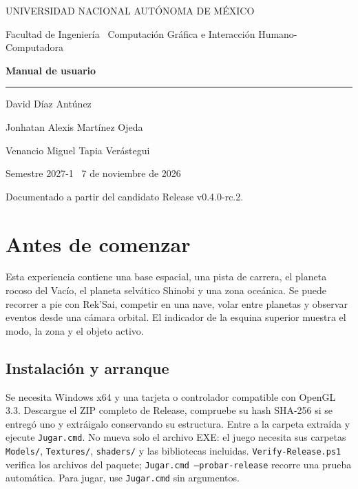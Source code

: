 \documentclass[11pt,letterpaper]{article}
\begin{document}
\begin{titlepage}
\color{azul}\sffamily
\vspace*{2.8cm}
{\Large UNIVERSIDAD NACIONAL AUTÓNOMA DE MÉXICO\par}
{\large Facultad de Ingeniería \textbar\ Computación Gráfica e Interacción Humano-Computadora\par}
\vspace{2cm}
{\Huge\bfseries Manual de usuario\par}
\vspace{0.5cm}{\Large Viajes espaciales y evolución de especies intergalácticas\par}
\vspace{1.5cm}\rule{\linewidth}{2pt}\vspace{0.5cm}
{\large David Díaz Antúnez\par Jonhatan Alexis Martínez Ojeda\par Venancio Miguel Tapia Verástegui\par}
\vfill{\large Semestre 2027-1 \textbar\ 7 de noviembre de 2026\par}
{\small Documentado a partir del candidato Release v0.4.0-rc.2.\par}
\end{titlepage}
\tableofcontents\newpage

\section{Antes de comenzar}
Esta experiencia contiene una base espacial, una pista de carrera, el planeta rocoso del Vacío, el planeta selvático Shinobi y una zona oceánica. Se puede recorrer a pie con Rek'Sai, competir en una nave, volar entre planetas y observar eventos desde una cámara orbital. El indicador de la esquina superior muestra el modo, la zona y el objeto activo.

\subsection{Instalación y arranque}
Se necesita Windows x64 y una tarjeta o controlador compatible con OpenGL 3.3. Descargue el ZIP completo de Release, compruebe su hash SHA-256 si se entregó uno y extráigalo conservando su estructura. Entre a la carpeta extraída y ejecute \texttt{Jugar.cmd}. No mueva solo el archivo EXE: el juego necesita sus carpetas \texttt{Models/}, \texttt{Textures/}, \texttt{shaders/} y las bibliotecas incluidas. \texttt{Verify-Release.ps1} verifica los archivos del paquete; \texttt{Jugar.cmd --probar-release} recorre una prueba automática. Para jugar, use \texttt{Jugar.cmd} sin argumentos.
\end{document}
